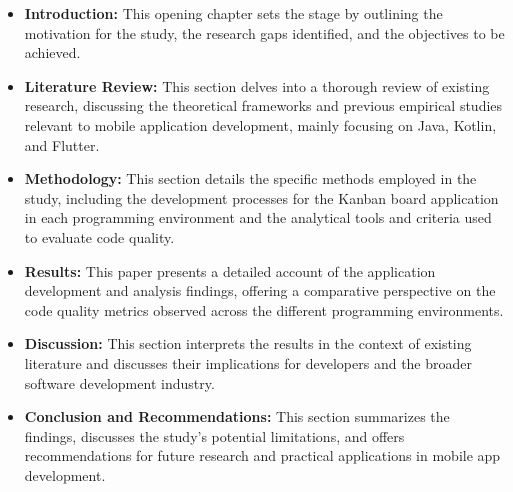\begin{itemize}
    \item \textbf{Introduction:} This opening chapter sets the stage by outlining the motivation for the study, the research gaps identified, and the objectives to be achieved.
    \item \textbf{Literature Review:} This section delves into a thorough review of existing research, discussing the theoretical frameworks and previous empirical studies relevant to mobile application development, mainly focusing on Java, Kotlin, and Flutter.
    \item \textbf{Methodology:} This section details the specific methods employed in the study, including the development processes for the Kanban board application in each programming environment and the analytical tools and criteria used to evaluate code quality. 
    \item \textbf{Results:} This paper presents a detailed account of the application development and analysis findings, offering a comparative perspective on the code quality metrics observed across the different programming environments.
    \item \textbf{Discussion:} This section interprets the results in the context of existing literature and discusses their implications for developers and the broader software development industry.
    \item \textbf{Conclusion and Recommendations:} This section summarizes the findings, discusses the study’s potential limitations, and offers recommendations for future research and practical applications in mobile app development.
\end{itemize}
